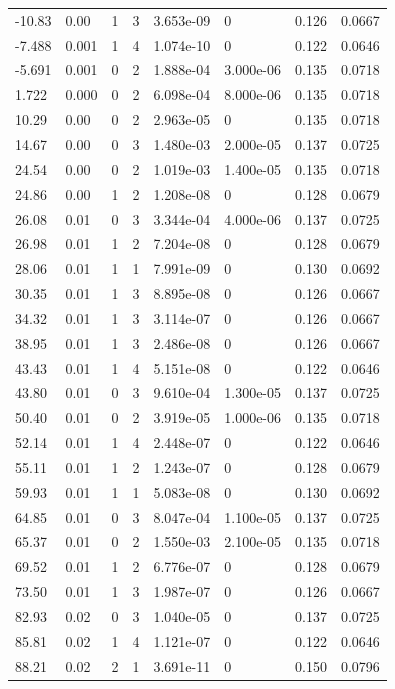 \documentclass[preview]{standalone}
\begin{document}
{{\begin{tabular}{L{1.2cm}C{1.2cm} C{0.3cm}C{0.5cm} C{1.4cm}C{1.4cm} C{1.4cm}C{1.4cm}}
  -10.83  &  0.00  & 1     &  3 &  3.653e-09  & 0  & 0.126 &  0.0667   \\ 
  -7.488  &  0.001  & 1     &  4 &  1.074e-10  & 0  & 0.122 &  0.0646   \\ 
  -5.691  &  0.001  & 0     &  2 &  1.888e-04  & 3.000e-06  & 0.135 &  0.0718   \\ 
  1.722  &  0.000  & 0     &  2 &  6.098e-04  & 8.000e-06  & 0.135 &  0.0718   \\ 
  10.29  &  0.00  & 0     &  2 &  2.963e-05  & 0  & 0.135 &  0.0718   \\ 
  14.67  &  0.00  & 0     &  3 &  1.480e-03  & 2.000e-05  & 0.137 &  0.0725   \\ 
  24.54  &  0.00  & 0     &  2 &  1.019e-03  & 1.400e-05  & 0.135 &  0.0718   \\ 
  24.86  &  0.00  & 1     &  2 &  1.208e-08  & 0  & 0.128 &  0.0679   \\ 
  26.08  &  0.01  & 0     &  3 &  3.344e-04  & 4.000e-06  & 0.137 &  0.0725   \\ 
  26.98  &  0.01  & 1     &  2 &  7.204e-08  & 0  & 0.128 &  0.0679   \\ 
  28.06  &  0.01  & 1     &  1 &  7.991e-09  & 0  & 0.130 &  0.0692   \\ 
  30.35  &  0.01  & 1     &  3 &  8.895e-08  & 0  & 0.126 &  0.0667   \\ 
  34.32  &  0.01  & 1     &  3 &  3.114e-07  & 0  & 0.126 &  0.0667   \\ 
  38.95  &  0.01  & 1     &  3 &  2.486e-08  & 0  & 0.126 &  0.0667   \\ 
  43.43  &  0.01  & 1     &  4 &  5.151e-08  & 0  & 0.122 &  0.0646   \\ 
  43.80  &  0.01  & 0     &  3 &  9.610e-04  & 1.300e-05  & 0.137 &  0.0725   \\ 
  50.40  &  0.01  & 0     &  2 &  3.919e-05  & 1.000e-06  & 0.135 &  0.0718   \\ 
  52.14  &  0.01  & 1     &  4 &  2.448e-07  & 0  & 0.122 &  0.0646   \\ 
  55.11  &  0.01  & 1     &  2 &  1.243e-07  & 0  & 0.128 &  0.0679   \\ 
  59.93  &  0.01  & 1     &  1 &  5.083e-08  & 0  & 0.130 &  0.0692   \\ 
  64.85  &  0.01  & 0     &  3 &  8.047e-04  & 1.100e-05  & 0.137 &  0.0725   \\ 
  65.37  &  0.01  & 0     &  2 &  1.550e-03  & 2.100e-05  & 0.135 &  0.0718   \\ 
  69.52  &  0.01  & 1     &  2 &  6.776e-07  & 0  & 0.128 &  0.0679   \\ 
  73.50  &  0.01  & 1     &  3 &  1.987e-07  & 0  & 0.126 &  0.0667   \\ 
  82.93  &  0.02  & 0     &  3 &  1.040e-05  & 0  & 0.137 &  0.0725   \\ 
  85.81  &  0.02  & 1     &  4 &  1.121e-07  & 0  & 0.122 &  0.0646   \\ 
  88.21  &  0.02  & 2     &  1 &  3.691e-11  & 0  & 0.150 &  0.0796   \\ 
\hline 
\end{tabular} 

}}
\end{document}

